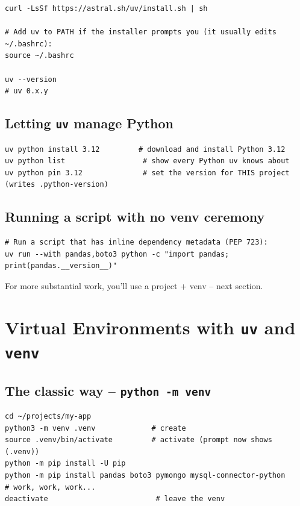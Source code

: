 \documentclass[11pt,a4paper]{article}
\begin{document}
\begin{lstlisting}[style=bashstyle]
curl -LsSf https://astral.sh/uv/install.sh | sh

# Add uv to PATH if the installer prompts you (it usually edits ~/.bashrc):
source ~/.bashrc

uv --version
# uv 0.x.y
\end{lstlisting}

\subsection*{Letting \texttt{uv} manage Python}

\begin{lstlisting}[style=bashstyle]
uv python install 3.12         # download and install Python 3.12
uv python list                  # show every Python uv knows about
uv python pin 3.12              # set the version for THIS project (writes .python-version)
\end{lstlisting}

\subsection*{Running a script with no venv ceremony}

\begin{lstlisting}[style=bashstyle]
# Run a script that has inline dependency metadata (PEP 723):
uv run --with pandas,boto3 python -c "import pandas; print(pandas.__version__)"
\end{lstlisting}

For more substantial work, you'll use a project + venv -- next
section.

\section{Virtual Environments with \texttt{uv} and \texttt{venv}}

\subsection*{The classic way -- \texttt{python -m venv}}

\begin{lstlisting}[style=bashstyle]
cd ~/projects/my-app
python3 -m venv .venv             # create
source .venv/bin/activate         # activate (prompt now shows (.venv))
python -m pip install -U pip
python -m pip install pandas boto3 pymongo mysql-connector-python
# work, work, work...
deactivate                         # leave the venv
\end{lstlisting}
\end{document}
